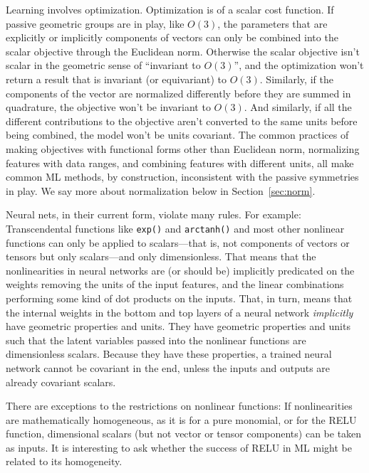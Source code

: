 \documentclass[]{article} %
\newcommand{\sectionname}{Section}
\newcommand{\secref}[1]{\sectionname~\ref{#1}}
\begin{document}
Learning involves optimization.
Optimization is of a scalar cost function.
If passive geometric groups are in play, like $O(3)$, the parameters that are explicitly or implicitly components of vectors can only be combined into the scalar objective through the Euclidean norm. Otherwise the scalar objective isn't scalar in the geometric sense of ``invariant to $O(3)$'', and the optimization won't return a result that is invariant (or equivariant) to $O(3)$.
Similarly, if the components of the vector are normalized differently before they are summed in quadrature, the objective won't be invariant to $O(3)$.
And similarly, if all the different contributions to the objective aren't converted to the same units before being combined, the model won't be units covariant.
The common practices of making objectives with functional forms other than Euclidean norm, normalizing features with data ranges, and combining features with different units, all make common ML methods, by construction, inconsistent with the passive symmetries in play.
We say more about normalization below in \secref{sec:norm}.

Neural nets, in their current form, violate many rules. For example:
Transcendental functions like \texttt{exp()} and \texttt{arctanh()} and most other nonlinear functions can only be applied to scalars---that is, not components of vectors or tensors but only scalars---and only dimensionless.
That means that the nonlinearities in neural networks are (or should be) implicitly predicated on the weights removing the units of the input features, and the linear combinations performing some kind of dot products on the inputs.
That, in turn, means that the internal weights in the bottom and top layers of a neural network \emph{implicitly} have geometric properties and units.
They have geometric properties and units such that the latent variables passed into the nonlinear functions are dimensionless scalars.
Because they have these properties, a trained neural network cannot be covariant in the end, unless the inputs and outputs are already covariant scalars.

There are exceptions to the restrictions on nonlinear functions:
If nonlinearities are mathematically homogeneous, as it is for a pure monomial, or for the RELU function, dimensional scalars (but not vector or tensor components) can be taken as inputs.
It is interesting to ask whether the success of RELU in ML might be related to its homogeneity.
\end{document}
